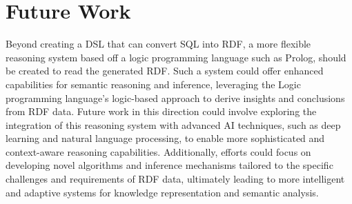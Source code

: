 \section{Future Work}

Beyond creating a DSL that can convert SQL into RDF, a more flexible reasoning system based off a logic programming language such as Prolog, should be created to read the generated RDF.  Such a system could offer enhanced capabilities for semantic reasoning and inference, leveraging the Logic programming language's logic-based approach to derive insights and conclusions from RDF data. Future work in this direction could involve exploring the integration of this reasoning system with advanced AI techniques, such as deep learning and natural language processing, to enable more sophisticated and context-aware reasoning capabilities. Additionally, efforts could focus on developing novel algorithms and inference mechanisms tailored to the specific challenges and requirements of RDF data, ultimately leading to more intelligent and adaptive systems for knowledge representation and semantic analysis.

